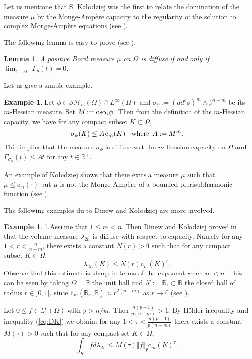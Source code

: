 \documentclass[12pt]{amsart}
\newtheorem{lemma}[theorem]{Lemma}
\theoremstyle{definition}
\newtheorem{example}[theorem]{Example}
\numberwithin{theorem}{section}
\numberwithin{equation}{section}
\newcommand{\B}{\mathbb{B}}
\newcommand{\R}{\mathbb{R}}
\begin{document}
{ 
 Let us mentione that S.  Ko\l odziej was the first to relate the domination  of the measure $\mu$ by the Monge-Amp\`ere capacity to the regularity of the solution to complex Monge-Amp\`ere equations (see \cite{Kol96}). 
 
The following lemma is easy to prove (see \cite{Po16}).
\begin{lemma}
A   positive Borel measure $\mu$ on $\Omega$ is  diffuse  if and only if $\lim_{t \to 0^+} \Gamma_\mu (t) = 0$.
\end{lemma}
 
 Let us give a simple example.
 \begin{example} Let $\phi \in  \mathcal{SH}_m(\Omega) \cap L^{\infty} (\Omega)$ and  $\sigma_\phi  := (dd^c \phi)^m \wedge \beta^{n-m}$ be its $m$-Hessian measure. Set $M := \hbox{osc}_{\Omega} \phi$. 
 Then from the definition of the $m$-Hessian capacity, we have for any compact subset $K \subset \Omega$,
 $$
 \sigma_\phi   (K) \leq A  \, \text{c}_m (K), \, \, \, \hbox{where} \, \, \, A := M^m.
 $$
  This implies that the measure $\sigma_\phi$ is diffuse  wrt the $m$-Hessian capacity on $\Omega$ and  $\Gamma_{\sigma_\phi}  (t) \leq A t$ for any $t \in \R^+$.  
  
 An example of Ko\l odziej shows that there exits a measure $\mu$ such that $\mu \leq \text{c}_m (\cdot)$ but $\mu$ is not the Monge-Amp\`ere of a bounded plurisubharmonic function (see \cite{Kol96}).
 \end{example} 

The following examples du to Dinew and Ko\l odziej   are more involved.
\begin{example}
1.Assume that $1 \leq m < n$. Then  Dinew and Ko\l odziej  proved in \cite{DK14} that the volume measure $\lambda_{2 n}$ is diffuse with respect to capacity. Namely for any $1 < r < \frac{n}{n - m}$, there exists a constant $N (r) > 0$ such that for any compact subset $K \subset \Omega$, 
\begin{equation} \label{eq:DK}
\lambda_{2 n} (K) \leq N (r) \text{c}_m (K)^{r}.
\end{equation}
 Observe that this estimate is sharp in terms of the exponent when $m < n$. This can be seen by taking $\Omega = \B$ the unit ball and  $K := \bar{\B_r} \subset \B$ the closed ball of radius $r \in ]0,1[$, since $\text{c}_m(\bar{\B}_r ,\B) \approx  r^{2 (n-m)}$ as $r \to 0$ (see \cite{Lu12}).

  Let $ 0 \leq f \in L^p (\Omega)$ with $p > n \slash m$. Then $ \frac{n (p-1)}{p (n - m)} > 1$. By H\"older inequality and inequality (\ref{eq:DK}) we obtain: for any  $1 < \tau < \frac{n (p-1)}{p (n - m)}$ there exists a constant $M (\tau) > 0$ such that for any compact set $K \subset \Omega$, 
\begin{equation*} 
\int_K f d \lambda_{2 n} \leq  M (\tau) \Vert f\Vert_p  \text{c}_m (K)^{\tau}.
\end{equation*}


\end{example}}
\end{document}
